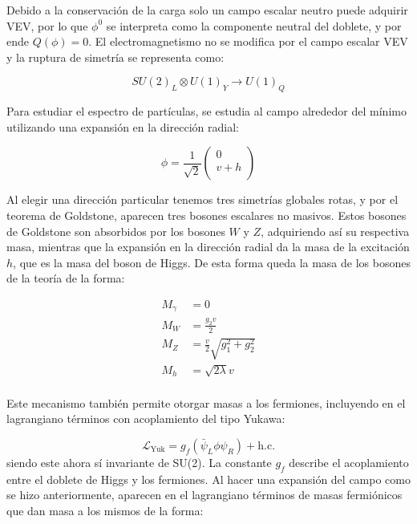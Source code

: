 Debido a la conservación de la carga solo un campo escalar neutro puede adquirir VEV, por lo que $\phi^0$ se interpreta como la componente neutral del doblete, y por ende $Q(\phi)=0$. El electromagnetismo no se modifica por el campo escalar VEV y la ruptura de simetría se representa como:

\begin{equation}
SU(2)_L \otimes U(1)_Y \rightarrow U(1)_Q
\end{equation}

Para estudiar el espectro de partículas, se estudia al campo alrededor del mínimo utilizando una expansión en la dirección radial:

\begin{equation}
	\phi = \frac{1}{\sqrt{2}}
	\begin{pmatrix}
	0 \\
	v + h \\
	\end{pmatrix}
\end{equation}

Al elegir una dirección particular tenemos tres simetrías globales rotas, y por el teorema de Goldstone, aparecen tres bosones escalares no masivos. Estos bosones de Goldstone son absorbidos por los bosones $W$ y $Z$, adquiriendo así su respectiva masa, mientras que la expansión en la dirección radial da la masa de la excitación $h$, que es la masa del boson de Higgs. De esta forma queda la masa de los bosones de la teoría de la forma:

\begin{equation}
\begin{split}
	M_{\gamma} & = 0 \\
	M_{W} & = \frac{g_2 v}{2} \\
	M_{Z} & = \frac{v}{2}\sqrt{g_1^2 + g_2^2} \\
	M_{h} & = \sqrt{2\lambda}v \\
\end{split}
\end{equation}

Este mecanismo también permite otorgar masas a los fermiones, incluyendo en el lagrangiano términos con acoplamiento del tipo Yukawa:

\begin{equation}
	\mathcal{L}_{\text{Yuk}} = g_f(\bar{\psi}_L\phi \psi_R) + \text{h.c.}
\end{equation}
%
siendo este ahora sí invariante de SU(2). La constante $g_f$ describe el acoplamiento entre el doblete de Higgs y los fermiones. Al hacer una expansión del campo como se hizo anteriormente, aparecen en el lagrangiano términos de masas fermiónicos que dan masa a los mismos de la forma:

